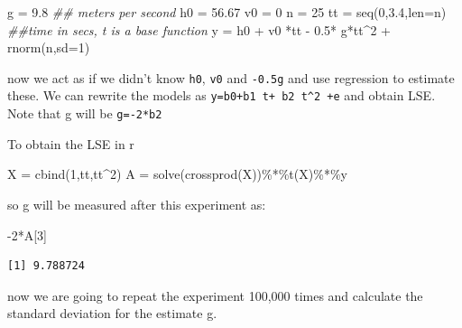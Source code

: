 \documentclass[
  letterpaper,
  DIV=11,
  numbers=noendperiod]{scrartcl}
\newenvironment{Shaded}{\begin{snugshade}}{\end{snugshade}}
\newcommand{\AttributeTok}[1]{\textcolor[rgb]{0.40,0.45,0.13}{#1}}
\newcommand{\DecValTok}[1]{\textcolor[rgb]{0.68,0.00,0.00}{#1}}
\newcommand{\DocumentationTok}[1]{\textcolor[rgb]{0.37,0.37,0.37}{\textit{#1}}}
\newcommand{\FloatTok}[1]{\textcolor[rgb]{0.68,0.00,0.00}{#1}}
\newcommand{\FunctionTok}[1]{\textcolor[rgb]{0.28,0.35,0.67}{#1}}
\newcommand{\NormalTok}[1]{\textcolor[rgb]{0.00,0.23,0.31}{#1}}
\newcommand{\OtherTok}[1]{\textcolor[rgb]{0.00,0.23,0.31}{#1}}
\newcommand{\SpecialCharTok}[1]{\textcolor[rgb]{0.37,0.37,0.37}{#1}}
\begin{document}
\begin{Shaded}
\begin{Highlighting}[]
\NormalTok{g }\OtherTok{=} \FloatTok{9.8} \DocumentationTok{\#\# meters per second}
\NormalTok{h0 }\OtherTok{=} \FloatTok{56.67}
\NormalTok{v0 }\OtherTok{=} \DecValTok{0}
\NormalTok{n }\OtherTok{=} \DecValTok{25}
\NormalTok{tt }\OtherTok{=} \FunctionTok{seq}\NormalTok{(}\DecValTok{0}\NormalTok{,}\FloatTok{3.4}\NormalTok{,}\AttributeTok{len=}\NormalTok{n) }\DocumentationTok{\#\#time in secs, t is a base function}
\NormalTok{y }\OtherTok{=}\NormalTok{ h0 }\SpecialCharTok{+}\NormalTok{ v0 }\SpecialCharTok{*}\NormalTok{tt  }\SpecialCharTok{{-}} \FloatTok{0.5}\SpecialCharTok{*}\NormalTok{ g}\SpecialCharTok{*}\NormalTok{tt}\SpecialCharTok{\^{}}\DecValTok{2} \SpecialCharTok{+} \FunctionTok{rnorm}\NormalTok{(n,}\AttributeTok{sd=}\DecValTok{1}\NormalTok{)}
\end{Highlighting}
\end{Shaded}

now we act as if we didn't know \texttt{h0}, \texttt{v0} and
\texttt{-0.5g} and use regression to estimate these. We can rewrite the
models as \texttt{y=b0+b1\ t+\ b2\ t\^{}2\ +e} and obtain LSE. Note that
g will be \texttt{g=-2*b2}

To obtain the LSE in r

\begin{Shaded}
\begin{Highlighting}[]
\NormalTok{X }\OtherTok{=} \FunctionTok{cbind}\NormalTok{(}\DecValTok{1}\NormalTok{,tt,tt}\SpecialCharTok{\^{}}\DecValTok{2}\NormalTok{)}
\NormalTok{A }\OtherTok{=} \FunctionTok{solve}\NormalTok{(}\FunctionTok{crossprod}\NormalTok{(X))}\SpecialCharTok{\%*\%}\FunctionTok{t}\NormalTok{(X)}\SpecialCharTok{\%*\%}\NormalTok{y}
\end{Highlighting}
\end{Shaded}

so g will be measured after this experiment as:

\begin{Shaded}
\begin{Highlighting}[]
\SpecialCharTok{{-}}\DecValTok{2}\SpecialCharTok{*}\NormalTok{A[}\DecValTok{3}\NormalTok{]}
\end{Highlighting}
\end{Shaded}

\begin{verbatim}
[1] 9.788724
\end{verbatim}

now we are going to repeat the experiment 100,000 times and calculate
the standard deviation for the estimate g.
\end{document}
